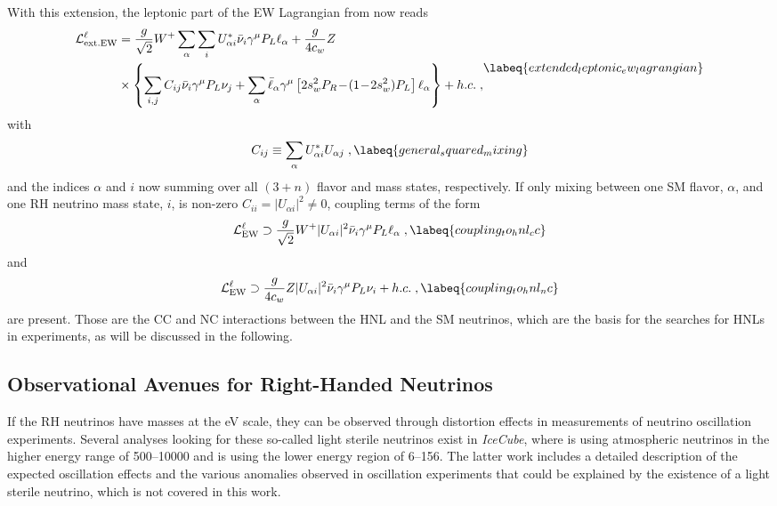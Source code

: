 With this extension, the leptonic part of the EW Lagrangian from  now reads
\begin{equation}
    \begin{aligned}
        \mathcal{L}^{\ell}_{\rm ext. EW} &= \frac{g}{\sqrt{2}}W^+ \sum _{\alpha } \sum _{i} U_{\alpha i}^* {\bar{\nu}}_{i}\gamma ^\mu P_L \ell _\alpha + \frac{g}{4c_w} Z \\& \times \left\{ \sum _{i, j} C_{ij} {\bar{\nu}}_{i}\gamma ^\mu P_L \nu_j + \sum _\alpha {\bar{\ell }}_\alpha \gamma ^\mu \left[ 2s_w^2P_R\!-\!(1\!-\!2s_w^2)P_L \right] \ell _\alpha \right\} + h.c.
        \;,
    \end{aligned}
    \labeq{extended_leptonic_ew_lagrangian}
\end{equation}
with
\begin{equation}
    C_{ij} \equiv \sum _\alpha U^*_{\alpha i} U_{\alpha j}
    \;,
    \labeq{general_squared_mixing}
\end{equation}
and the indices $\alpha$ and $i$ now summing over all $(3+n)$ flavor and mass states, respectively. If only mixing between one SM flavor, $\alpha$, and one RH neutrino mass state, $i$, is non-zero $C_{ii} = |U_{\alpha i}|^2 \neq 0$, coupling terms of the form
\begin{equation}
    \mathcal{L}^{\ell}_{\rm EW} \supset \frac{g}{\sqrt{2}}W^+ |U_{\alpha i}|^2 {\bar{\nu}}_{i}\gamma ^\mu P_L \ell _\alpha
    \;,
    \labeq{coupling_to_hnl_cc}
\end{equation}
and
\begin{equation}
    \mathcal{L}^{\ell}_{\rm EW} \supset \frac{g}{4c_w} Z |U_{\alpha i}|^2 {\bar{\nu}}_{i}\gamma ^\mu P_L \nu_i + h.c.
    \;,
    \labeq{coupling_to_hnl_nc}
\end{equation}
are present. Those are the CC and NC interactions between the HNL and the SM neutrinos, which are the basis for the searches for HNLs in experiments, as will be discussed in the following.


\subsection{Observational Avenues for Right-Handed Neutrinos}

If the RH neutrinos have masses at the \si{\electronvolt} scale, they can be observed through distortion effects in measurements of neutrino oscillation experiments. Several analyses looking for these so-called light sterile neutrinos exist in \textit{IceCube}, where  is using atmospheric neutrinos in the higher energy range of \SIrange{500}{10000}{\gev} and  is using the lower energy region of \SIrange{6}{156}{\gev}. The latter work includes a detailed description of the expected oscillation effects and the various anomalies observed in oscillation experiments that could be explained by the existence of a light sterile neutrino, which is not covered in this work.

